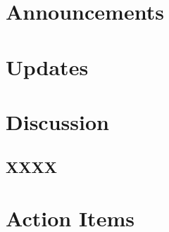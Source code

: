 \documentclass{meetingmins}
\begin{document}
\maketitle

\section{Announcements}
    \begin{items}
        \item
    \end{items}

\section{Updates}
    \begin{items}
        \item
    \end{items}

\section{Discussion}
    \subsection{XXXX}
    \begin{subitems}
        \item
    \end{subitems}

\section{Action Items}
    \begin{items}
        \item 
    \end{items}

\end{document}
